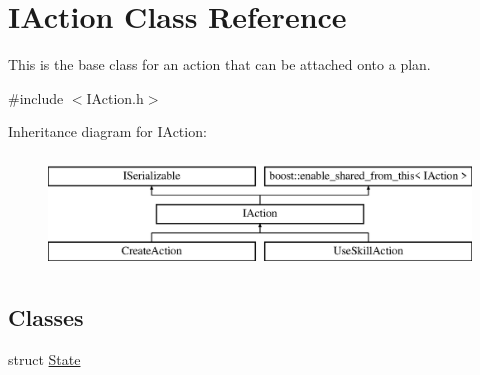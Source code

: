 \hypertarget{class_i_action}{}\section{I\+Action Class Reference}
\label{class_i_action}


This is the base class for an action that can be attached onto a plan.  




{\ttfamily \#include $<$I\+Action.\+h$>$}

Inheritance diagram for I\+Action\+:\begin{figure}[H]
\begin{center}
\leavevmode
\includegraphics[height=3.000000cm]{class_i_action}
\end{center}
\end{figure}
\subsection*{Classes}
\begin{DoxyCompactItemize}
\item 
struct \hyperlink{struct_i_action_1_1_state}{State}
\end{DoxyCompactItemize}
